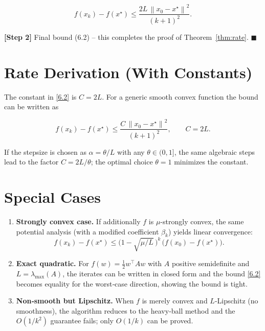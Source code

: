 \documentclass{article}
\newcommand{\norm}[1]{\left\|#1\right\|}
\begin{document}
\[
f(x_k)-f(x^{\star})\le
\frac{2L\,\norm{x_0-x^{\star}}^{2}}{(k+1)^{2}}.
\tag{6.2}
\]

\textbf{[Step 2] } Final bound (6.2) – this completes the proof of
Theorem~\ref{thm:rate}. \hfill\(\blacksquare\)

\section*{Rate Derivation (With Constants)}
The constant in \eqref{6.2} is \(C=2L\).  For a generic smooth convex
function the bound can be written as  

\[
f(x_k)-f(x^{\star})\le
\frac{C\,\norm{x_0-x^{\star}}^{2}}{(k+1)^{2}},\qquad
C=2L.
\]

If the stepsize is chosen as \(\alpha=\theta/L\) with any
\(\theta\in(0,1]\), the same algebraic steps lead to the factor
\(C=2L/\theta\); the optimal choice \(\theta=1\) minimizes the constant.

\section*{Special Cases}
\begin{enumerate}[leftmargin=*]
\item \textbf{Strongly convex case.}
If additionally \(f\) is \(\mu\)-strongly convex, the same potential
analysis (with a modified coefficient \(\beta_k\)) yields linear
convergence:
\[
f(x_k)-f(x^{\star})\le
\bigl(1-\sqrt{\mu/L}\,\bigr)^{k}\,
\bigl(f(x_0)-f(x^{\star})\bigr).
\]

\item \textbf{Exact quadratic.}
For \(f(w)=\frac12 w^{\top}Aw\) with \(A\) positive semidefinite and
\(L=\lambda_{\max}(A)\), the iterates can be written in closed form and
the bound \eqref{6.2} becomes equality for the worst‑case direction,
showing the bound is tight.

\item \textbf{Non‑smooth but Lipschitz.}
When \(f\) is merely convex and \(L\)-Lipschitz (no smoothness), the
algorithm reduces to the heavy‑ball method and the \(O(1/k^{2})\) guarantee
fails; only \(O(1/k)\) can be proved.
\end{enumerate}
\end{document}
